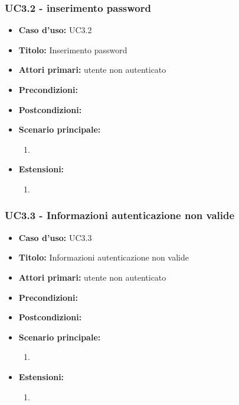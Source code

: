 \documentclass[casi-duso]{subfiles}
\begin{document}
\subsubsection{UC3.2 - inserimento password}
\label{subsub:uc3.2utente}
\begin{itemize}
  \item \textbf{Caso d’uso:} UC3.2 
  \item \textbf{Titolo:} Inserimento password
  \item \textbf{Attori primari:} utente non autenticato
  \item \textbf{Precondizioni:} 
  \item \textbf{Postcondizioni:}
  \item \textbf{Scenario principale:} 
  \begin{enumerate}
    \item 
  \end{enumerate}  
  \item \textbf{Estensioni:} 
  \begin{enumerate}
    \item 
  \end{enumerate}  
\end{itemize}

\subsubsection{UC3.3 - Informazioni autenticazione non valide}
\label{subsub:uc3.3utente}
\begin{itemize}
  \item \textbf{Caso d’uso:} UC3.3 
  \item \textbf{Titolo:} Informazioni autenticazione non valide
  \item \textbf{Attori primari:} utente non autenticato
  \item \textbf{Precondizioni:} 
  \item \textbf{Postcondizioni:}
  \item \textbf{Scenario principale:} 
  \begin{enumerate}
    \item 
  \end{enumerate}  
  \item \textbf{Estensioni:} 
  \begin{enumerate}
    \item 
  \end{enumerate}  
\end{itemize}
\end{document}

